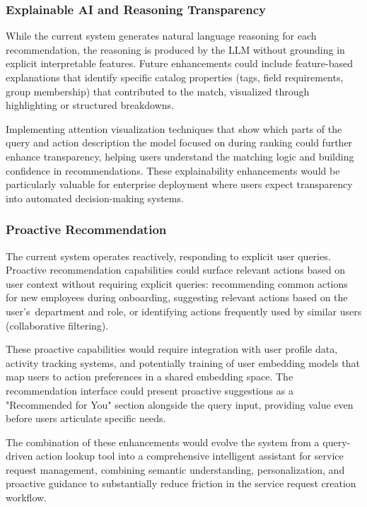 \subsubsection{Explainable AI and Reasoning Transparency}

While the current system generates natural language reasoning for each recommendation, the reasoning is produced by the LLM without grounding in explicit interpretable features. Future enhancements could include feature-based explanations that identify specific catalog properties (tags, field requirements, group membership) that contributed to the match, visualized through highlighting or structured breakdowns.

Implementing attention visualization techniques that show which parts of the query and action description the model focused on during ranking could further enhance transparency, helping users understand the matching logic and building confidence in recommendations. These explainability enhancements would be particularly valuable for enterprise deployment where users expect transparency into automated decision-making systems.

\subsubsection{Proactive Recommendation}\label{sec:proactive-recommendation}

The current system operates reactively, responding to explicit user queries. Proactive recommendation capabilities could surface relevant actions based on user context without requiring explicit queries: recommending common actions for new employees during onboarding, suggesting relevant actions based on the user's~department and role, or identifying actions frequently used by similar users (collaborative filtering).

These proactive capabilities would require integration with user profile data, activity tracking systems, and potentially training of user embedding models that map users to action preferences in a shared embedding space. The recommendation interface could present proactive suggestions as a "Recommended for You" section alongside the query input, providing value even before users articulate specific needs.

The combination of these enhancements would evolve the system from a query-driven action lookup tool into a comprehensive intelligent assistant for service request management, combining semantic understanding, personalization, and proactive guidance to substantially reduce friction in the service request creation workflow.

